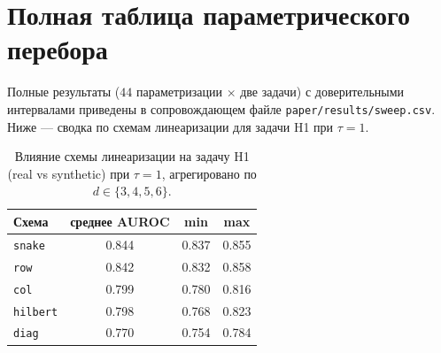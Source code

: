 \documentclass[14pt]{extarticle}
\theoremstyle{plain}
\numberwithin{equation}{section}
\numberwithin{figure}{section}
\numberwithin{table}{section}
\begin{document}
\clearpage
{}


\clearpage
\appendix
\section{Полная таблица параметрического перебора}
\label{app:sweep}
Полные результаты ($44$ параметризации $\times$ две задачи) с доверительными
интервалами приведены в сопровождающем файле \texttt{paper/results/sweep.csv}.
Ниже — сводка по схемам линеаризации для задачи H1 при $\tau=1$.

\begin{table}[h!]
\centering
\caption{Влияние схемы линеаризации на задачу H1 (real vs synthetic) при
$\tau=1$, агрегировано по $d\in\{3,4,5,6\}$.}
\label{tab:scheme}
\begin{tabular}{@{}lccc@{}}
\toprule
Схема & среднее AUROC & min & max \\
\midrule
\texttt{snake}   & 0.844 & 0.837 & 0.855 \\
\texttt{row}     & 0.842 & 0.832 & 0.858 \\
\texttt{col}     & 0.799 & 0.780 & 0.816 \\
\texttt{hilbert} & 0.798 & 0.768 & 0.823 \\
\texttt{diag}    & 0.770 & 0.754 & 0.784 \\
\bottomrule
\end{tabular}

\end{table}
\end{document}
